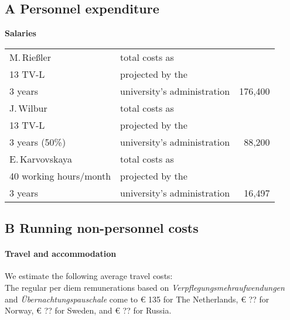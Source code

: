 \documentclass[a4paper,12pt]{article}
\begin{document}
\subsection*{A Personnel expenditure}
\noindent \textbf{Salaries}\\
\begin{longtable}{| l | l | r |}
\hline
M.\,Rießler&total costs as&\\
13 TV-L&projected by the&\\
3 years&university's administration&176,400\\
\hline
J.\,Wilbur&total costs as&\\
13 TV-L&projected by the&\\
3 years (50\%)&university's administration&88,200\\
\hline
E.\,Karvovskaya&total costs as&\\
40 working hours/month& projected by the&\\
3 years&university's administration&16,497\\
\hline
\end{longtable}

\subsection*{B Running non-personnel costs}
\paragraph{Travel and accommodation}
We estimate the following average travel costs:\\

\noindent The regular per diem remunerations based on \textit{Verpflegungsmehraufwendungen} and \textit{Übernachtungspauschale} come to € 135 for The Netherlands, € ?? for Norway, € ?? for Sweden, and € ?? for Russia.
\end{document}

